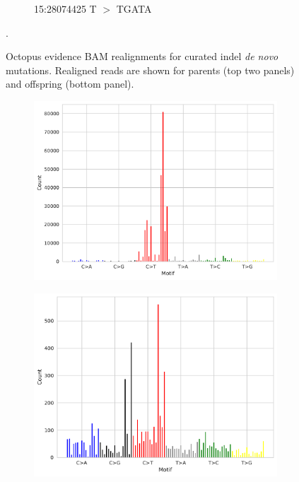 \documentclass{article}
\begin{document}
\begin{landscape}
\begin{figure}[ht!]
\begin{subfigure}[b]{0.33\textwidth}
        \caption{\tiny 15:28074425 T $>$ TGATA}
    \end{subfigure}
    \caption{Octopus evidence BAM realignments for curated indel \textit{de novo} mutations. Realigned reads are shown for parents (top two panels) and offspring (bottom panel).}.
    \label{subfig:denovo-realignments}
\end{figure}

\end{landscape}

\clearpage

\begin{figure}[ht!]
    \centering
    \begin{subfigure}[b]{0.49\textwidth}
        \includegraphics[width=\textwidth]{figures/synthetic_skin_tumour_snvs}
        \caption{}
        \label{supfig:synthetic-skin-snv}
    \end{subfigure}
    \hfill
    \begin{subfigure}[b]{0.49\textwidth}
        \includegraphics[width=\textwidth]{figures/synthetic_breast_tumour_snvs}

\end{subfigure}
\end{figure}
\end{document}
